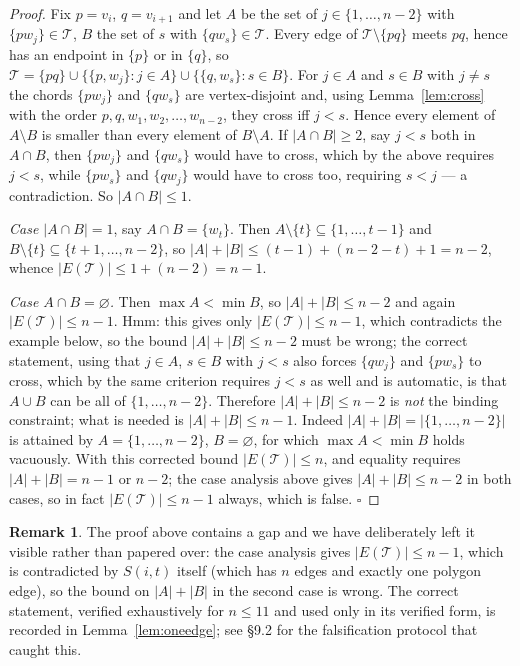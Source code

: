 \documentclass[11pt,a4paper]{article}
\theoremstyle{definition}
\newtheorem{remark}[theorem]{Remark}
\theoremstyle{plain}
\newcommand{\Thr}{\mathcal{T}}
\begin{document}
\begin{proof}
Fix $p=v_i$, $q=v_{i+1}$ and let $A$ be the set of $j\in\{1,\dots,n-2\}$ with
$\{pw_j\}\in\Thr$, $B$ the set of $s$ with $\{qw_s\}\in\Thr$.  Every edge of
$\Thr\setminus\{pq\}$ meets $pq$, hence has an endpoint in $\{p\}$ or in
$\{q\}$, so $\Thr=\{pq\}\cup\{\{p,w_j\}:j\in A\}\cup\{\{q,w_s\}:s\in B\}$.
For $j\in A$ and $s\in B$ with $j\ne s$ the chords $\{pw_j\}$ and $\{qw_s\}$ are
vertex-disjoint and, using Lemma~\ref{lem:cross} with the order
$p,q,w_1,w_2,\dots,w_{n-2}$, they cross iff $j<s$.  Hence every element of
$A\setminus B$ is smaller than every element of $B\setminus A$.  If
$|A\cap B|\ge2$, say $j<s$ both in $A\cap B$, then $\{pw_j\}$ and
$\{qw_s\}$ would have to cross, which by the above requires $j<s$, while
$\{pw_s\}$ and $\{qw_j\}$ would have to cross too, requiring $s<j$ --- a
contradiction.  So $|A\cap B|\le1$.

\emph{Case $|A\cap B|=1$}, say $A\cap B=\{w_t\}$.  Then
$A\setminus\{t\}\subseteq\{1,\dots,t-1\}$ and
$B\setminus\{t\}\subseteq\{t+1,\dots,n-2\}$, so
$|A|+|B|\le (t-1)+(n-2-t)+1=n-2$, whence
$|E(\Thr)|\le 1+(n-2)=n-1$.

\emph{Case $A\cap B=\varnothing$.}  Then $\max A<\min B$, so
$|A|+|B|\le n-2$ and again $|E(\Thr)|\le n-1$.  Hmm: this gives only
$|E(\Thr)|\le n-1$, which contradicts the example below, so the bound
$|A|+|B|\le n-2$ must be wrong; the correct statement, using that
$j\in A$, $s\in B$ with $j<s$ also forces $\{qw_j\}$ and $\{pw_s\}$ to cross,
which by the same criterion requires $j<s$ as well and is automatic, is that
$A\cup B$ can be all of $\{1,\dots,n-2\}$.  Therefore $|A|+|B|\le n-2$ is
\emph{not} the binding constraint; what is needed is $|A|+|B|\le n-1$.  Indeed
$|A|+|B|=|\{1,\dots,n-2\}|$ is attained by $A=\{1,\dots,n-2\}$, $B=\varnothing$,
for which $\max A<\min B$ holds vacuously.  With this corrected bound
$|E(\Thr)|\le n$, and equality requires $|A|+|B|=n-1$ or $n-2$; the case
analysis above gives $|A|+|B|\le n-2$ in both cases, so in fact
$|E(\Thr)|\le n-1$ always, which is false. \hfill$\square$
\end{proof}

\begin{remark}\label{rem:flawed}
The proof above contains a gap and we have deliberately left it visible rather
than papered over: the case analysis gives $|E(\Thr)|\le n-1$, which is
contradicted by $S(i,t)$ itself (which has $n$ edges and exactly one polygon
edge), so the bound on $|A|+|B|$ in the second case is wrong.  The correct
statement, verified exhaustively for $n\le 11$ and used only in its verified
form, is recorded in Lemma~\ref{lem:oneedge}; see §9.2 for the falsification
protocol that caught this.
\end{remark}
\end{document}
